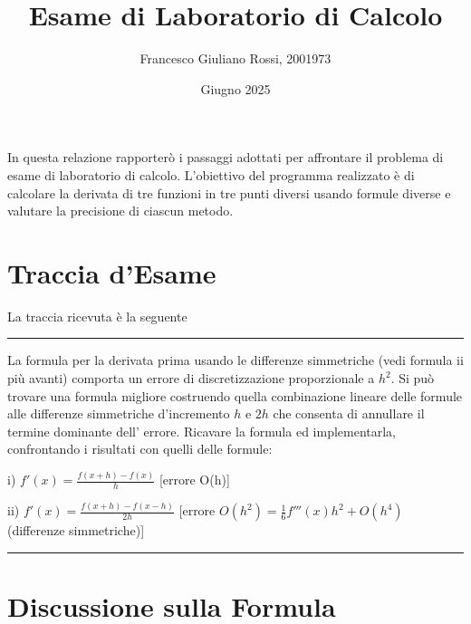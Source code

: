 \documentclass[a4paper]{article}
\author{Francesco Giuliano Rossi, 2001973}
\date{Giugno 2025}
\title{Esame di Laboratorio di Calcolo}
\begin{document}
\maketitle
\tableofcontents

\abstract
In questa relazione rapporterò i passaggi adottati per affrontare il problema di esame di laboratorio di calcolo. L'obiettivo del programma realizzato è di calcolare la derivata di tre funzioni in tre punti diversi usando formule diverse e valutare la precisione di ciascun metodo. 

\section{Traccia d'Esame}
La traccia ricevuta è la seguente

\noindent\rule{\linewidth}{0.5pt}
La formula per la derivata prima usando le differenze simmetriche (vedi formula ii più avanti) comporta un errore di discretizzazione proporzionale a $h^2$. Si può  trovare una formula migliore costruendo quella combinazione lineare delle formule alle differenze simmetriche d'incremento  $h$  e $2h$  che consenta di annullare il termine dominante dell' errore.
Ricavare la formula ed implementarla, confrontando i risultati con
quelli delle formule:

i)  $f'(x) = \frac{f(x+h) - f(x)}{h}$    [errore O(h)]

ii) $f'(x) = \frac{f(x+h) - f(x-h) }{2h}$  [errore $O(h^2) = \frac{1}{6} f'''(x)h^2 + O(h^4)$  (differenze simmetriche)]

\par\noindent\rule{\linewidth}{0.5pt}

\section{Discussione sulla Formula}
\end{document}
